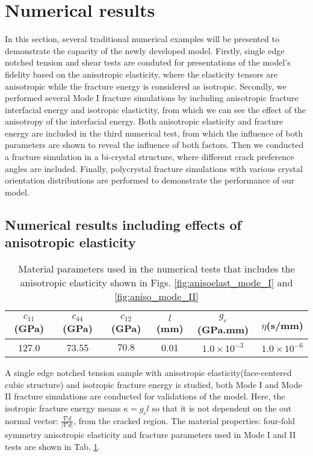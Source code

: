 \documentclass[3p,10pt,sort&compress]{elsarticle}
\begin{document}
\section{Numerical results}
In this section, several traditional numerical examples will be presented to demonstrate the capacity of the newly developed model. Firstly, single edge notched tension and shear tests are conduted for presentations of the model's fidelity based on the anisotropic elasticity, where the elasticity tensors are anisotropic while the fracture energy is considered as isotropic. Secondly, we performed several Mode I fracture simulations by including anisotropic fracture interfacial energy and isotropic elastictity, from which we can see the effect of the anisotropy of the interfacial energy. Both anisotropic elasticity and fracture energy are included in the third numerical test, from which the influence of both parameters are shown to reveal the influence of both factors. Then we conducted a fracture simulation in a bi-crystal structure, where different crack preference angles are included. Finally, polycrystal fracture simulations with various crystal orientation distributions are performed to demonstrate the performance of our model.


\subsection{Numerical results including effects of anisotropic elasticity}
\begin{table}
\centering
\begin{tabular}{ |c|c|c|c|c|c|}
 \hline
  $c_{11}$(GPa) & $c_{44}$(GPa) & $c_{12}$(GPa) & $l$(mm) & $g_c$(GPa.mm) & $\eta$(s/mm) \\
  \hline
  127.0  & 73.55  & $70.8$ & 0.01 & $1.0\times 10^{-3}$ & $1.0\times 10^{-6}$\\
 \hline
\end{tabular}
\caption{Material parameters used in the numerical tests that includes the anisotropic elasticity shown in Figs. \ref{fig:anisoelast_mode_I} and \ref{fig:aniso_mode_II}}
\label{table:copper}
\end{table}
A single edge notched tension sample with anisotropic elasticity(face-centered cubic structure) and isotropic fracture energy is studied, both Mode I and Mode II fracture simulations are conducted for validations of the model. Here, the isotropic fracture energy means $\kappa = g_c l$ so that it is not dependent on the out normal vector: $\frac{\nabla d}{|\nabla d|}$, from the cracked region. The material properties: four-fold symmetry anisotropic elasticity and fracture parameters used in Mode I and II tests are shown in Tab. \ref{table:copper}.
\end{document}
